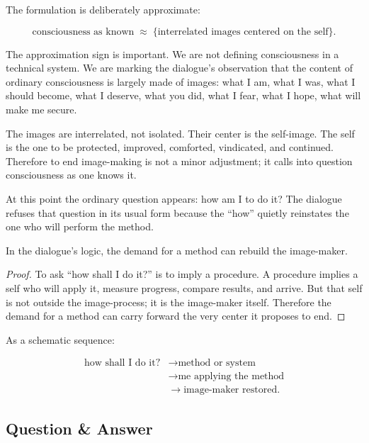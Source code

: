 The formulation is deliberately approximate:

\begin{equation}
\text{consciousness as known}
\;\approx\;
\{\text{interrelated images centered on the self}\}.
\end{equation}

The approximation sign is important. We are not defining consciousness in a technical system. We are marking the dialogue's observation that the content of ordinary consciousness is largely made of images: what I am, what I was, what I should become, what I deserve, what you did, what I fear, what I hope, what will make me secure.

The images are interrelated, not isolated. Their center is the self-image. The self is the one to be protected, improved, comforted, vindicated, and continued. Therefore to end image-making is not a minor adjustment; it calls into question consciousness as one knows it.

At this point the ordinary question appears: how am I to do it? The dialogue refuses that question in its usual form because the ``how'' quietly reinstates the one who will perform the method.

\begin{proposition}
In the dialogue's logic, the demand for a method can rebuild the image-maker.
\end{proposition}

\begin{proof}
To ask ``how shall I do it?'' is to imply a procedure. A procedure implies a self who will apply it, measure progress, compare results, and arrive. But that self is not outside the image-process; it is the image-maker itself. Therefore the demand for a method can carry forward the very center it proposes to end.
\end{proof}

As a schematic sequence:

\begin{align}
\text{how shall I do it?}
&\longrightarrow \text{method or system} \\
&\longrightarrow \text{me applying the method} \\
&\longrightarrow \text{image-maker restored}.
\end{align}

\subsection{Question \& Answer}

